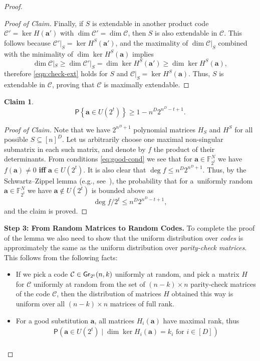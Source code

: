 \documentclass[conference]{IEEEtran}
\newcommand{\Iff}{\textbf{if\textcompwordmark f} }
\newcommand{\rbr}[1]{\left(#1\right)}
\newcommand{\fbr}[1]{\left\{#1\right\}}
\let\le\leqslant
\let\ge\geqslant
\theoremstyle{plain}
\newtheorem{claim}{Claim}[theorem]
\theoremstyle{definition}
\theoremstyle{remark}
\newcommand{\va}{\mathbf{a}}
\newcommand{\cC}{\mathcal{C}}
\newcommand{\F}{\mathbb{F}}
\newcommand{\Gr}{{\sf Gr}}
\newcommand{\PP}{\mathsf{P}}
\begin{document}
\begin{proof}
\begin{proof}[Proof of Claim]
    Finally, if $S$ is extendable in another product code $\cC' = \ker H(\va')$ with $\dim \cC' = \dim \cC$, then $S$ is also extendable in $\cC$. This follows because $\cC'|_S = \ker H^S(\va')$, and the maximality of $\dim \cC|_S$ combined with the minimality of $\dim \ker H^S(\va)$ implies 
    \[
    \dim \cC|_S\ge \dim \cC'|_S=\dim \ker  H^S(\va')\ge \dim \ker H^S(\va), 
    \]
    therefore \eqref{eqn:check-ext} holds for $S$ and $\cC|_S = \ker H^S(\va)$.
    Thus, $S$ is extendable in $\cC$, proving that $\cC$ is maximally extendable. 
    \end{proof} 
    \begin{claim}\label{cl:proof}
         \[\PP\fbr{\va \in U(2^t)}\ge 1 - n^D 2^{n^D - t + 1}.\]
    \end{claim}
    \begin{proof}[Proof of Claim]
        Note that we have $2^{n^D + 1}$ polynomial matrices $H_S$ and $H^S$ for all possible $S\subseteq [n]^D$. Let us arbitrarily choose one maximal non-singular submatrix in each such matrix, and denote by $f$ the product of their determinants. 
        From conditions \eqref{eq:good-cond} we see that for $\va\in \F^N_{2^t}$ we have $f(\va)\ne 0$ \Iff $\va\in U(2^t)$. 
        It is also clear that $\deg f \le n^D 2^{n^D + 1}$. 
        Thus, by the Schwartz–Zippel lemma (e.g., see~\cite[Theorem~7.2]{motwaniRandomizedAlgorithms1995}), the probability that for a~uniformly random $\va\in \F^N_{2^t}$ we have $\va \not\in U(2^t)$ is bounded above as \[\deg f/2^t \le n^D 2^{n^D - t + 1},\] and the claim is proved.      
    \end{proof}
 \textbf{Step 3: From Random Matrices to Random Codes.}
 To complete the proof of the lemma we also need to show that the uniform distribution over \emph{codes} is approximately the same as the uniform distribution over \emph{parity-check matrices}. This follows from the following facts:
 \begin{itemize}
    \item If we pick a code $\cC\in\Gr_{2^t}(n,k)$ uniformly at random, and pick a~matrix $H$ for $\cC$ uniformly at random from the set of $(n-k)\times n$ parity-check matrices of the code $\cC$, then the distribution of matrices $H$ obtained this way is uniform over all $(n-k)\times n$ matrices of full rank.
    \item For a good substitution $\va$, all matrices $H_i(\va)$ have maximal rank, thus
    \begin{multline*}
        \PP\rbr{\va\in U(2^t)\mid \dim \ker H_i(\va)=k_i\mbox{ for }i\in[D]}\\

\end{multline*}
\end{itemize}
\end{proof}
\end{document}
